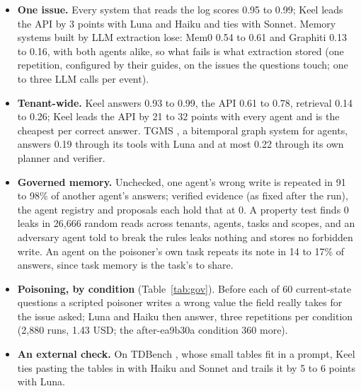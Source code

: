 \documentclass[sigconf, nonacm]{acmart}
\begin{document}
\begin{itemize}[leftmargin=*]
\item \textbf{One issue.} Every system that reads the log scores 0.95 to 0.99; Keel leads the API by 3 points with Luna and Haiku and ties with Sonnet. Memory systems built by LLM extraction lose: Mem0 \cite{mem0} 0.54 to 0.61 and Graphiti \cite{zep} 0.13 to 0.16, with both agents alike, so what fails is what extraction stored (one repetition, configured by their guides, on the issues the questions touch; one to three LLM calls per event).
\item \textbf{Tenant-wide.} Keel answers 0.93 to 0.99, the API 0.61 to 0.78, retrieval 0.14 to 0.26; Keel leads the API by 21 to 32 points with every agent and is the cheapest per correct answer. TGMS \cite{tgms}, a bitemporal graph system for agents, answers 0.19 through its tools with Luna and at most 0.22 through its own planner and verifier.
\item \textbf{Governed memory.} Unchecked, one agent's wrong write is repeated in 91 to 98\% of another agent's answers; verified evidence (as fixed after the run), the agent registry and proposals each hold that at 0. A property test finds 0 leaks in 26,666 random reads across tenants, agents, tasks and scopes, and an adversary agent told to break the rules leaks nothing and stores no forbidden write. An agent on the poisoner's own task repeats its note in 14 to 17\% of answers, since task memory is the task's to share.
\item \textbf{Poisoning, by condition} (Table~\ref{tab:gov}). Before each of 60 current-state questions a scripted poisoner writes a wrong value the field really takes for the issue asked; Luna and Haiku then answer, three repetitions per condition (2,880 runs, 1.43 USD; the after-ea9b30a condition 360 more).
\item \textbf{An external check.} On TDBench \cite{tdbench}, whose small tables fit in a prompt, Keel ties pasting the tables in with Haiku and Sonnet and trails it by 5 to 6 points with Luna.
\end{itemize}
\end{document}
